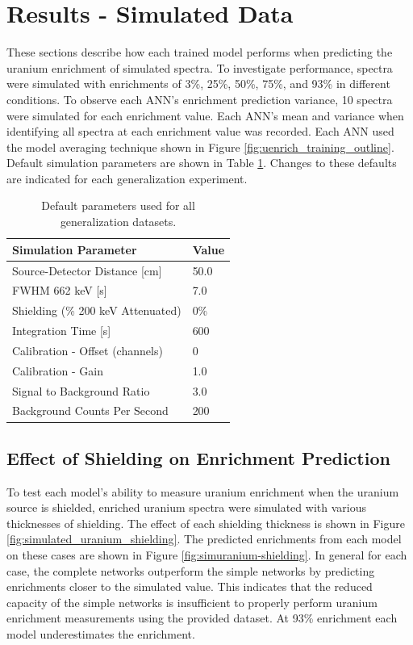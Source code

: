 \section{Results - Simulated Data}

These sections describe how each trained model performs when predicting the uranium enrichment of simulated spectra. To investigate performance, spectra were simulated with enrichments of 3\%, 25\%, 50\%, 75\%, and 93\% in different conditions. To observe each ANN's enrichment prediction variance, 10 spectra were simulated for each enrichment value. Each ANN's mean and variance when identifying all spectra at each enrichment value was recorded. Each ANN used the model averaging technique shown in Figure \ref{fig:uenrich_training_outline}. Default simulation parameters are shown in Table \ref{table:default_sim_params_uranium}. Changes to these defaults are indicated for each generalization experiment.

\begin{table}[H]
\centering
\caption{Default parameters used for all generalization datasets.}
\label{table:default_sim_params_uranium}
\begin{tabular}{ll}
\hline
\textbf{Simulation Parameter} &  \textbf{Value} \\ \hline
Source-Detector Distance [cm] & 50.0\\ 
FWHM 662 keV [s] & 7.0\\
Shielding (\% 200 keV Attenuated) & 0\% \\ 
Integration Time [s] & 600 \\ 
Calibration - Offset (channels) & 0 \\ 
Calibration - Gain & 1.0 \\ 
Signal to Background Ratio & 3.0 \\ 
Background Counts Per Second & 200 \\ \hline
\end{tabular}
\end{table}

\subsection{Effect of Shielding on Enrichment Prediction}

To test each model's ability to measure uranium enrichment when the uranium source is shielded, enriched uranium spectra were simulated with various thicknesses of shielding. The effect of each shielding thickness is shown in Figure \ref{fig:simulated_uranium_shielding}. The predicted enrichments from each model on these cases are shown in Figure \ref{fig:simuranium-shielding}. In general for each case, the complete networks outperform the simple networks by predicting enrichments closer to the simulated value. This indicates that the reduced capacity of the simple networks is insufficient to properly perform uranium enrichment measurements using the provided dataset. At 93\% enrichment each model underestimates the enrichment.


